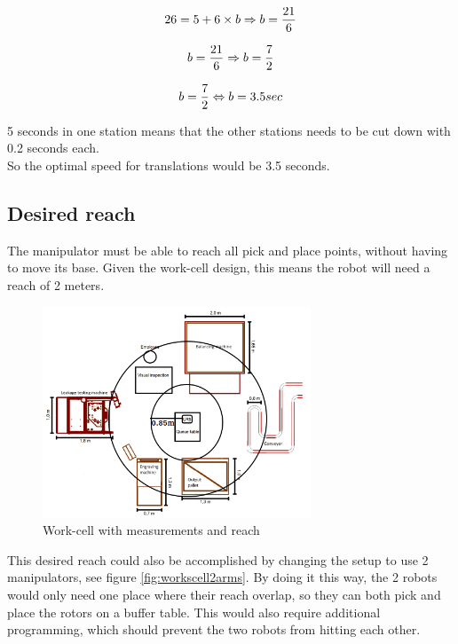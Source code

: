 \begin{equation}
    26 = 5 + 6 \times b \Rightarrow b = \frac{21}{6}\\
\end{equation}

\begin{equation}
    b = \frac{21}{6} \Rightarrow b = \frac{7}{2}\\
\end{equation}

\begin{equation}
    b = \frac{7}{2} \Leftrightarrow  b = 3.5 sec\\
\end{equation}

5 seconds in one station means that the other stations needs to be cut down with 0.2 seconds each.\\
So the optimal speed for translations would be 3.5 seconds.\\

\subsection{Desired reach}

The manipulator must be able to reach all pick and place points, without having to move its base. Given the work-cell design, this means the robot will need a reach of 2 meters. \\
\begin{figure}[H]
    \centering
    \includegraphics[width=8cm]{Design/Work_cell_3.png}
    \caption{Work-cell with measurements and reach}
    \label{fig:workcell}
\end{figure}

This desired reach could also be accomplished by changing the setup to use 2 manipulators, see figure \ref{fig:workscell2arms}. By doing it this way, the 2 robots would only need one place where their reach overlap, so they can both pick and place the rotors on a buffer table. This would also require additional programming, which should prevent the two robots from hitting each other.\\

